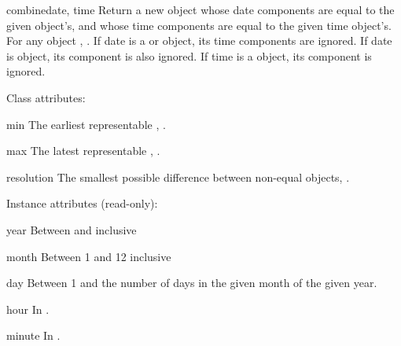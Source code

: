 \begin{methoddesc}{combine}{date, time}
    Return a new  object whose date components are
    equal to the given  object's, and whose time
    components are equal to the given time object's.  For any
     object , .  If date is a
     or  object, its time components
    are ignored.  If date is  object, its
     component is also ignored.  If time is a
     object, its  component is ignored.
\end{methoddesc}

Class attributes:

\begin{memberdesc}{min}
        The earliest representable ,
        .
\end{memberdesc}

\begin{memberdesc}{max}
        The latest representable ,
        .
\end{memberdesc}

\begin{memberdesc}{resolution}
        The smallest possible difference between non-equal 
        objects, .
\end{memberdesc}

Instance attributes (read-only):

\begin{memberdesc}{year}
Between  and  inclusive
\end{memberdesc}

\begin{memberdesc}{month}
Between 1 and 12 inclusive
\end{memberdesc}

\begin{memberdesc}{day}
Between 1 and the number of days in the given month of the given year.
\end{memberdesc}

\begin{memberdesc}{hour}
In .
\end{memberdesc}

\begin{memberdesc}{minute}
In .
\end{memberdesc}

